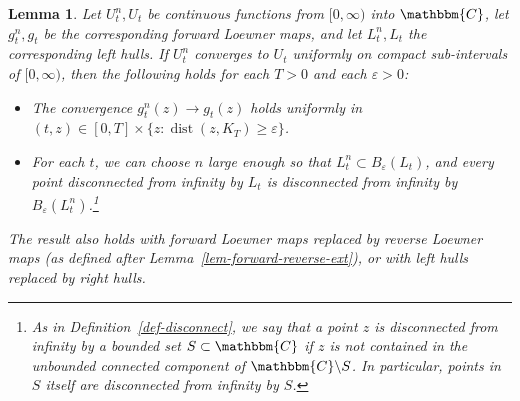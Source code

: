 \documentclass[11pt]{article}
\theoremstyle{plain}
\newtheorem{lem}[thm]{Lemma}
\theoremstyle{definition}
\numberwithin{equation}{section}
\newcommand{\BB}{\mathbbm}
\newcommand{\ep}{\varepsilon}
\newcommand{\rta}{\rightarrow}
\newcommand{\dist}{{\operatorname{dist}}}
\begin{document}
\begin{lem}
\label{lem-haus}
Let $U_t^n,U_t$ be continuous functions from $[0,\infty)$ into $\BB{C}$, let $g_t^n,g_t$ be the corresponding forward Loewner maps, and let $L_t^n,L_t$ the corresponding left hulls.  If $U_t^n$ converges to $U_t$ uniformly on compact sub-intervals of $[0,\infty)$, then the following holds for each $T >0$ and each $\ep>0$:
\begin{itemize}
\item
The convergence $g_t^n(z) \rta g_t(z)$ holds uniformly in $(t,z) \in [0,T] \times \{z: \dist(z,K_T) \geq \ep\}$.
\item
For each $t$, we can choose $n$ large enough so that 
$L_t^n \subset B_\ep(L_t)$,  and every point disconnected from infinity by $L_t$ is disconnected from infinity by $B_\ep(L_t^n)$.\footnote{As in Definition~\ref{def-disconnect}, we say that a point $z$ is disconnected from infinity by a bounded set $S \subset \BB{C}$ if $z$ is not contained in the unbounded connected component of $\BB{C} \backslash S$. In particular, points in $S$ itself are disconnected from infinity by $S$.}
\end{itemize}
The result also holds with forward Loewner maps replaced by reverse Loewner maps (as defined after Lemma~\ref{lem-forward-reverse-ext}), or with left hulls replaced by right hulls.
\end{lem}
\end{document}
